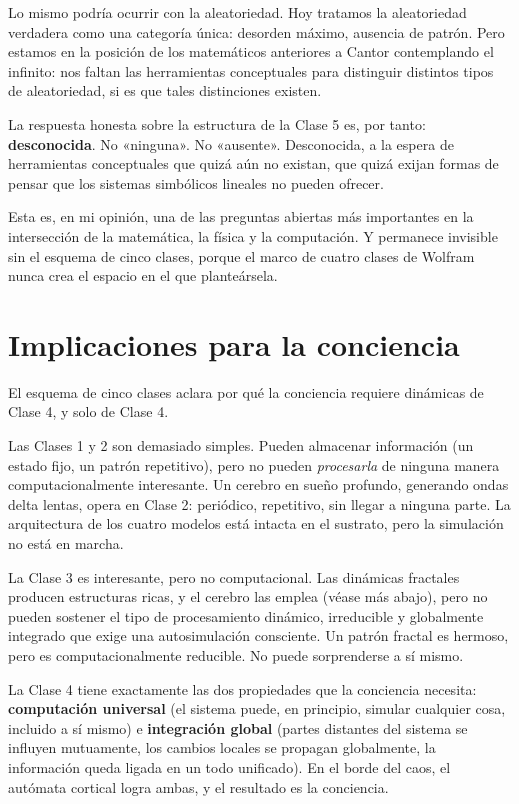 \documentclass[11pt, twoside, openright]{book}
\begin{document}
Lo mismo podría ocurrir con la aleatoriedad. Hoy tratamos la aleatoriedad verdadera como una categoría única: desorden máximo, ausencia de patrón. Pero estamos en la posición de los matemáticos anteriores a Cantor contemplando el infinito: nos faltan las herramientas conceptuales para distinguir distintos tipos de aleatoriedad, si es que tales distinciones existen.

La respuesta honesta sobre la estructura de la Clase 5 es, por tanto: \textbf{desconocida}. No «ninguna». No «ausente». Desconocida, a la espera de herramientas conceptuales que quizá aún no existan, que quizá exijan formas de pensar que los sistemas simbólicos lineales no pueden ofrecer.

Esta es, en mi opinión, una de las preguntas abiertas más importantes en la intersección de la matemática, la física y la computación. Y permanece invisible sin el esquema de cinco clases, porque el marco de cuatro clases de Wolfram nunca crea el espacio en el que planteársela.

\section*{Implicaciones para la conciencia}

El esquema de cinco clases aclara por qué la conciencia requiere dinámicas de Clase 4, y solo de Clase 4.

Las Clases 1 y 2 son demasiado simples. Pueden almacenar información (un estado fijo, un patrón repetitivo), pero no pueden \textit{procesarla} de ninguna manera computacionalmente interesante. Un cerebro en sueño profundo, generando ondas delta lentas, opera en Clase 2: periódico, repetitivo, sin llegar a ninguna parte. La arquitectura de los cuatro modelos está intacta en el sustrato, pero la simulación no está en marcha.

La Clase 3 es interesante, pero no computacional. Las dinámicas fractales producen estructuras ricas, y el cerebro las emplea (véase más abajo), pero no pueden sostener el tipo de procesamiento dinámico, irreducible y globalmente integrado que exige una autosimulación consciente. Un patrón fractal es hermoso, pero es computacionalmente reducible. No puede sorprenderse a sí mismo.

La Clase 4 tiene exactamente las dos propiedades que la conciencia necesita: \textbf{computación universal} (el sistema puede, en principio, simular cualquier cosa, incluido a sí mismo) e \textbf{integración global} (partes distantes del sistema se influyen mutuamente, los cambios locales se propagan globalmente, la información queda ligada en un todo unificado). En el borde del caos, el autómata cortical logra ambas, y el resultado es la conciencia.
\end{document}
